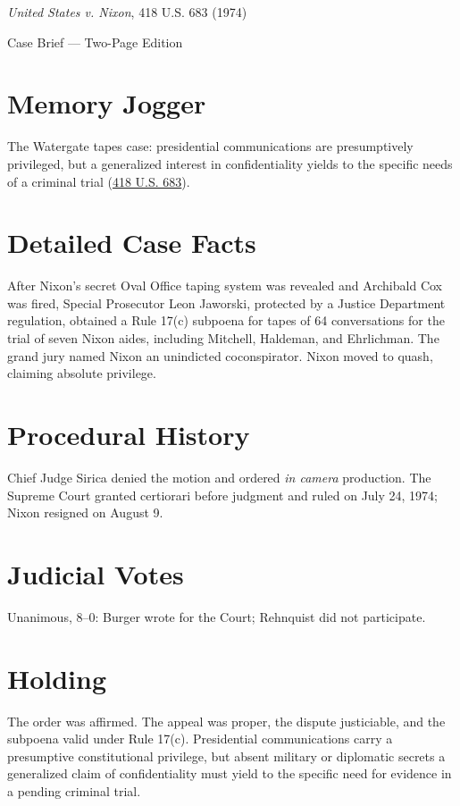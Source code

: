 \documentclass[12pt]{article}
\begin{document}
\begin{center}
{\LARGE \textit{United States v. Nixon}, 418 U.S. 683 (1974)\par}
\vspace{0.5em}
{\large Case Brief --- Two-Page Edition\par}
\end{center}

\section{Memory Jogger}
The Watergate tapes case: presidential communications are presumptively privileged, but a generalized interest in confidentiality yields to the specific needs of a criminal trial (\href{https://supreme.justia.com/cases/federal/us/418/683/}{418 U.S. 683}).

\section{Detailed Case Facts}
After Nixon's secret Oval Office taping system was revealed and Archibald Cox was fired, Special Prosecutor Leon Jaworski, protected by a Justice Department regulation, obtained a Rule 17(c) subpoena for tapes of 64 conversations for the trial of seven Nixon aides, including Mitchell, Haldeman, and Ehrlichman. The grand jury named Nixon an unindicted coconspirator. Nixon moved to quash, claiming absolute privilege.

\section{Procedural History}
Chief Judge Sirica denied the motion and ordered \textit{in camera} production. The Supreme Court granted certiorari before judgment and ruled on July 24, 1974; Nixon resigned on August 9.

\section{Judicial Votes}
Unanimous, 8--0: Burger wrote for the Court; Rehnquist did not participate.

\section{Holding}
The order was affirmed. The appeal was proper, the dispute justiciable, and the subpoena valid under Rule 17(c). Presidential communications carry a presumptive constitutional privilege, but absent military or diplomatic secrets a generalized claim of confidentiality must yield to the specific need for evidence in a pending criminal trial.
\end{document}
